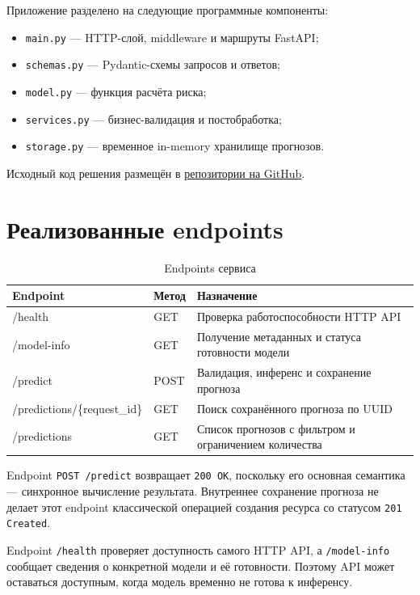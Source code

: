 \documentclass[12pt,a4paper]{article}
\newcommand{\code}[1]{\texttt{#1}}
\begin{document}
Приложение разделено на следующие программные компоненты:

\begin{itemize}
  \item \code{main.py} --- HTTP-слой, middleware и маршруты FastAPI;
  \item \code{schemas.py} --- Pydantic-схемы запросов и ответов;
  \item \code{model.py} --- функция расчёта риска;
  \item \code{services.py} --- бизнес-валидация и постобработка;
  \item \code{storage.py} --- временное in-memory хранилище прогнозов.
\end{itemize}

Исходный код решения размещён в
\href{https://github.com/Artem216/siss/tree/main/lab_01}{репозитории на GitHub}.

\section{Реализованные endpoints}

\begin{table}[H]
  \centering
  \caption{Endpoints сервиса}
  \label{tab:endpoints}
  \begin{tabularx}{\textwidth}{>{\ttfamily}p{4.3cm} p{1.5cm} Y}
    \toprule
    \normalfont\textbf{Endpoint} & \textbf{Метод} & \textbf{Назначение} \\
    \midrule
    /health & GET & Проверка работоспособности HTTP API \\
    /model-info & GET & Получение метаданных и статуса готовности модели \\
    /predict & POST & Валидация, инференс и сохранение прогноза \\
    /predictions/\{request\_id\} & GET & Поиск сохранённого прогноза по UUID \\
    /predictions & GET & Список прогнозов с фильтром и ограничением количества \\
    \bottomrule
  \end{tabularx}
\end{table}

Endpoint \code{POST /predict} возвращает \code{200 OK}, поскольку его основная
семантика --- синхронное вычисление результата. Внутреннее сохранение прогноза
не делает этот endpoint классической операцией создания ресурса со статусом
\code{201 Created}.

Endpoint \code{/health} проверяет доступность самого HTTP API, а
\code{/model-info} сообщает сведения о конкретной модели и её готовности.
Поэтому API может оставаться доступным, когда модель временно не готова к
инференсу.
\end{document}
